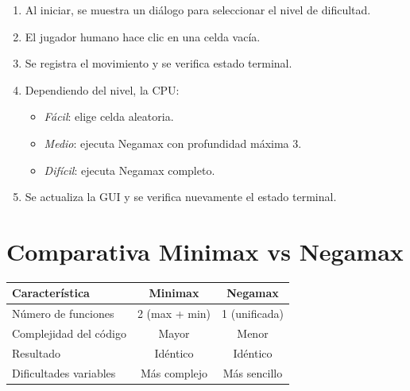 \documentclass[12pt,a4paper]{article}
\begin{document}
\begin{enumerate}
  \item Al iniciar, se muestra un diálogo para seleccionar el nivel de dificultad.
  \item El jugador humano hace clic en una celda vacía.
  \item Se registra el movimiento y se verifica estado terminal.
  \item Dependiendo del nivel, la CPU:
    \begin{itemize}
      \item \textit{Fácil}: elige celda aleatoria.
      \item \textit{Medio}: ejecuta Negamax con profundidad máxima 3.
      \item \textit{Difícil}: ejecuta Negamax completo.
    \end{itemize}
  \item Se actualiza la GUI y se verifica nuevamente el estado terminal.
\end{enumerate}

\section{Comparativa Minimax vs Negamax}

\begin{center}
\begin{tabular}{|l|c|c|}
\hline
\textbf{Característica} & \textbf{Minimax} & \textbf{Negamax} \\
\hline
Número de funciones & 2 (max + min) & 1 (unificada) \\
Complejidad del código & Mayor & Menor \\
Resultado & Idéntico & Idéntico \\
Dificultades variables & Más complejo & Más sencillo \\
\hline
\end{tabular}
\end{center}
\end{document}
